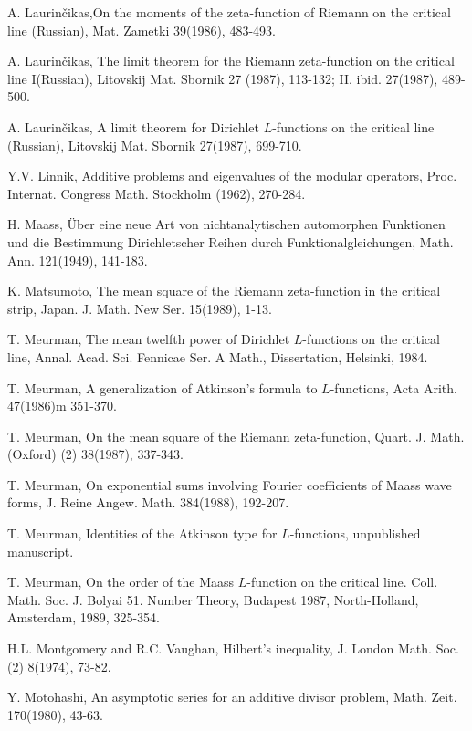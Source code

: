 \begin{thebibliography}{99}
 A. Laurin\v cikas,\pageoriginale On the moments of the zeta-function of Riemann on the critical line (Russian), Mat. Zametki 39(1986), 483-493.

 A. Laurin\v cikas, The limit theorem for the Riemann zeta-function on the critical line I(Russian), Litovskij Mat. Sbornik 27 (1987), 113-132; II. ibid. 27(1987), 489-500.

 A. Laurin\v cikas, A limit theorem for Dirichlet $L$-functions on the critical line (Russian), Litovskij Mat. Sbornik 27(1987), 699-710.

 Y.V. Linnik, Additive problems and eigenvalues of the modular operators, Proc. Internat. Congress Math. Stockholm (1962), 270-284.

 H. Maass, \"Uber eine neue Art von nichtanalytischen automorphen Funktionen und die Bestimmung Dirichletscher Reihen durch Funktionalgleichungen, Math. Ann. 121(1949), 141-183.

 K. Matsumoto, The mean square of the Riemann zeta-function in the critical strip, Japan. J. Math. New Ser. 15(1989), 1-13.

 T. Meurman, The mean twelfth power of Dirichlet $L$-functions on the critical line, Annal. Acad. Sci. Fennicae Ser. A Math., Dissertation, Helsinki, 1984.

 T. Meurman, A generalization of Atkinson's formula to $L$-functions, Acta Arith. 47(1986)m 351-370.

 T. Meurman, On the mean square of the Riemann zeta-function, Quart. J. Math. (Oxford) (2) 38(1987), 337-343.

 T. Meurman, On exponential sums involving Fourier coefficients of Maass wave forms, J. Reine Angew. Math. 384(1988), 192-207.

 T. Meurman, Identities of the Atkinson type for $L$-functions, unpublished manuscript.

 T. Meurman, On the order of the Maass $L$-function on the critical line. Coll. Math. Soc. J. Bolyai 51. Number Theory, Budapest 1987, North-Holland, Amsterdam, 1989, 325-354.

 H.L. Montgomery and R.C. Vaughan, Hilbert's inequality, J. London Math. Soc. (2) 8(1974), 73-82.

 Y. Motohashi, An asymptotic series for an additive divisor problem, Math. Zeit. 170(1980), 43-63.


\end{thebibliography}
